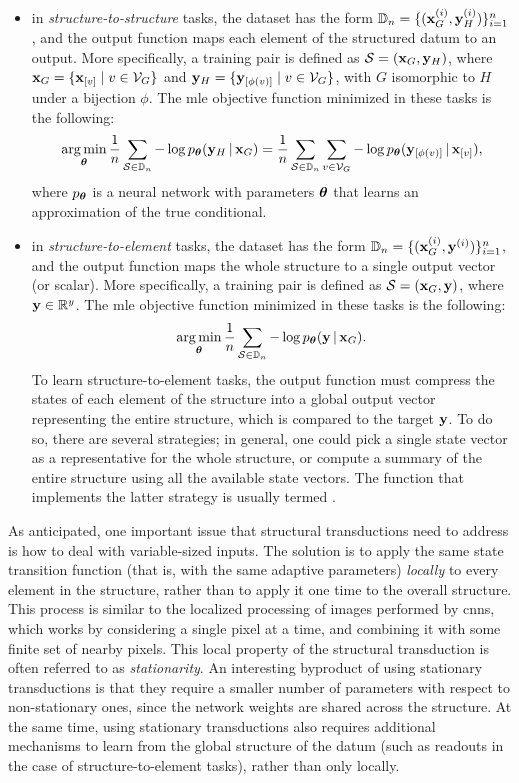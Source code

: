\begin{itemize}
    \item in \emph{structure-to-structure} tasks, the dataset has the form $\Data_n = \Set{(\Vector{x}_G^{(i)}, \Vector{y}_H^{(i)})}_{i=1}^n$, and the output function maps each element of the structured datum to an output. More specifically, a training pair is defined as $\Cal{S} = (\Vector{x}_G, \Vector{y}_H)$, where $\Vector{x}_G = \Set{\Elem{x}{v} \mid v \in \Cal{V}_G}$ and $\Vector{y}_H = \Set{\Elem{y}{\phi(v)} \mid v \in \Cal{V}_{G}}$, with $G$ isomorphic to $H$ under a bijection $\phi$. The \gls{mle} objective function minimized in these tasks is the following:
    $$\argmin_{\Param} \frac{1}{n} \sum_{\Cal{S} \in \Data_n} - \log p_{\Param}(\Vector{y}_H \given \Vector{x}_G) = \frac{1}{n}\sum_{\Cal{S} \in \Data_n} \sum_{v \in \Cal{V}_G} - \log p_{\Param}(\Elem{y}{\phi(v)} \given \Elem{x}{v}),$$
    where $p_{\boldsymbol{\theta}}$ is a neural network with parameters $\boldsymbol{\theta}$ that learns an approximation of the true conditional.
    \item in \emph{structure-to-element} tasks, the dataset has the form $\Data_n = \Set{(\Vector{x}_G^{(i)}, \Vector{y}^{(i)})}_{i=1}^n$, and the output function maps the whole structure to a single output vector (or scalar). More specifically, a training pair is defined as $\Cal{S} = (\Vector{x}_G, \Vector{y})$, where $\Vector{y} \in \Real^y$. The \gls{mle} objective function minimized in these tasks is the following:
    $$\argmin_{\Param} \frac{1}{n} \sum_{\Cal{S} \in \Data_n} - \log p_{\Param}(\Vector{y} \given \Vector{x}_G).$$
    To learn structure-to-element tasks, the output function must compress the states of each element of the structure into a global output vector representing the entire structure, which is compared to the target $\Vector{y}$. To do so, there are several strategies; in general, one could pick a single state vector as a representative for the whole structure, or compute a summary of the entire structure using all the available state vectors. The function that implements the latter strategy is usually termed .
\end{itemize}

As anticipated, one important issue that structural transductions need to address is how to deal with variable-sized inputs. The solution is to apply the same state transition function (that is, with the same adaptive parameters) \emph{locally} to every element in the structure, rather than to apply it one time to the overall structure. This process is similar to the localized processing of images performed by \glspl{cnn}, which works by considering a single pixel at a time, and combining it with some finite set of nearby pixels. This local property of the structural transduction is often referred to as \emph{stationarity}. An interesting byproduct of using stationary transductions is that they require a smaller number of parameters with respect to non-stationary ones, since the network weights are shared across the structure. At the same time, using stationary transductions also requires additional mechanisms to learn from the global structure of the datum (such as readouts in the case of structure-to-element tasks), rather than only locally.

